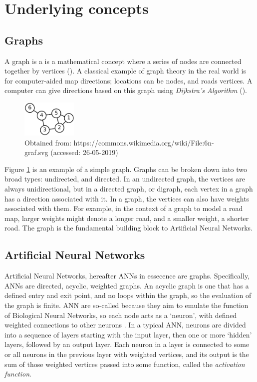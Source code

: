 \section{Underlying concepts}
    \subsection{Graphs}
    A graph is a is a mathematical concept where a series of nodes are connected together by vertices (\cite{chartrand2010graphs}). A classical example of graph theory in the real world is for computer-aided map directions; locations can be nodes, and roads vertices. A computer can give directions based on this graph using {\slshape Dijkstra's Algorithm} (\cite{dijkstra1959note}).

    \begin{figure}[h]
        \centering
        \includegraphics[width=100px]{../img/1000px-6n-graf.png}
        \caption{Obtained from: https://commons.wikimedia.org/wiki/File:6n-graf.svg (accessed: 26-05-2019)}
        \label{fig:simplegraph}
    \end{figure}

    Figure \ref{fig:simplegraph} is an example of a simple graph. Graphs can be broken down into two broad types: undirected, and directed. In an undirected graph, the vertices are always unidirectional, but in a directed graph, or digraph, each vertex in a graph has a direction associated with it. In a graph, the vertices can also have weights associated with them. For example, in the context of a graph to model a road map, larger weights might denote a longer road, and a smaller weight, a shorter road. The graph is the fundamental building block to Artificial Neural Networks.

    \subsection{Artificial Neural Networks}
    Artificial Neural Networks, hereafter ANNs in essecence are graphs. Specifically, ANNs are directed, acyclic, weighted graphs. An acyclic graph is one that has a defined entry and exit point, and no loops within the graph, so the evaluation of the graph is finite. ANN are so-called because they aim to emulate the function of Biological Neural Networks, so each node acts as a `neuron', with defined weighted connections to other neurons \cite{hopfield1982neural}. In a typical ANN, neurons are divided into a sequence of layers starting with the input layer, then one or more `hidden' layers, followed by an output layer. Each neuron in a layer is connected to some or all neurons in the previous layer with weighted vertices, and its output is the sum of those weighted vertices passed into some function, called the {\slshape activation function}. 

